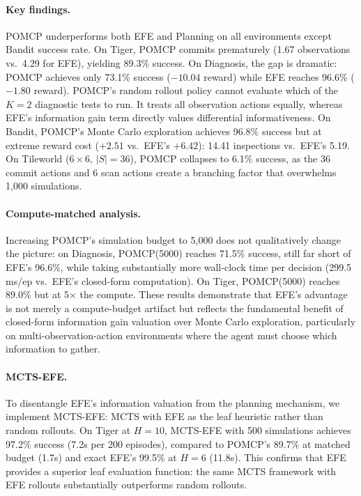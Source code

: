 \documentclass[runningheads]{llncs}
\begin{document}
\paragraph{Key findings.} POMCP underperforms both EFE and Planning on all environments except Bandit success rate. On Tiger, POMCP commits prematurely (1.67 observations vs.\ 4.29 for EFE), yielding 89.3\% success. On Diagnosis, the gap is dramatic: POMCP achieves only 73.1\% success ($-10.04$ reward) while EFE reaches 96.6\% ($-1.80$ reward). POMCP's random rollout policy cannot evaluate which of the $K{=}2$ diagnostic tests to run. It treats all observation actions equally, whereas EFE's information gain term directly values differential informativeness. On Bandit, POMCP's Monte Carlo exploration achieves 96.8\% success but at extreme reward cost ($+2.51$ vs.\ EFE's $+6.42$): 14.41 inspections vs.\ EFE's 5.19. On Tileworld ($6{\times}6$, $|S|{=}36$), POMCP collapses to 6.1\% success, as the 36 commit actions and 6 scan actions create a branching factor that overwhelms 1{,}000 simulations.

\paragraph{Compute-matched analysis.} Increasing POMCP's simulation budget to 5{,}000 does not qualitatively change the picture: on Diagnosis, POMCP(5000) reaches 71.5\% success, still far short of EFE's 96.6\%, while taking substantially more wall-clock time per decision (299.5 ms/ep vs.\ EFE's closed-form computation). On Tiger, POMCP(5000) reaches 89.0\% but at 5$\times$ the compute. These results demonstrate that EFE's advantage is not merely a compute-budget artifact but reflects the fundamental benefit of closed-form information gain valuation over Monte Carlo exploration, particularly on multi-observation-action environments where the agent must choose which information to gather.

\paragraph{MCTS-EFE.} To disentangle EFE's information valuation from the planning mechanism, we implement MCTS-EFE: MCTS with EFE as the leaf heuristic rather than random rollouts. On Tiger at $H{=}10$, MCTS-EFE with 500 simulations achieves 97.2\% success (7.2s per 200 episodes), compared to POMCP's 89.7\% at matched budget (1.7s) and exact EFE's 99.5\% at $H{=}6$ (11.8s). This confirms that EFE provides a superior leaf evaluation function: the same MCTS framework with EFE rollouts substantially outperforms random rollouts.
\end{document}
